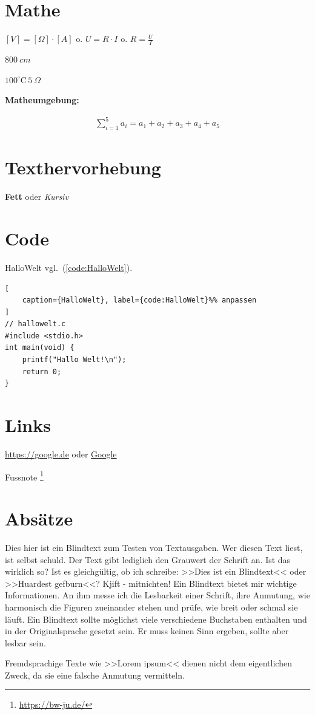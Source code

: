 \section{Mathe}\label{mathe}

$[ V ] = [ \Omega ] \cdot [ A ]$ o. $U = R \cdot I$ o.
$R = \frac{U}{I}$

$800~cm$

$100^\circ\text{C} \, 5~\Omega$

\textbf{Matheumgebung:}

\begin{align*}
    \sum_{i=1}^5 a_i = a_1 + a_2 + a_3 + a_4 + a_5
\end{align*}

\section{Texthervorhebung}\label{texthervorhebung}

\textbf{Fett} oder \emph{Kursiv}

\section{Code}\label{code}

HalloWelt vgl.~(\autoref{code:HalloWelt}).

\lstset{language=C}%
\begin{lstlisting}[
	caption={HalloWelt}, label={code:HalloWelt}%% anpassen
]
// hallowelt.c
#include <stdio.h>
int main(void) {
    printf("Hallo Welt!\n");
    return 0;
}
\end{lstlisting}

\section{Links}\label{links}

\url{https://google.de} oder \href{https://google.de}{Google}

Fussnote \footnote{\url{https://bw-ju.de/}}

\section{Absätze}\label{absaetze}

Dies hier ist ein Blindtext zum Testen von Textausgaben. Wer diesen Text
liest, ist selbst schuld. Der Text gibt lediglich den Grauwert der
Schrift an. Ist das wirklich so? Ist es gleichgültig, ob ich schreibe:
>>Dies ist ein Blindtext<< oder >>Huardest gefburn<<? Kjift -
mitnichten! Ein Blindtext bietet mir wichtige Informationen. An ihm
messe ich die Lesbarkeit einer Schrift, ihre Anmutung, wie harmonisch
die Figuren zueinander stehen und prüfe, wie breit oder schmal sie
läuft. Ein Blindtext sollte möglichst viele verschiedene Buchstaben
enthalten und in der Originalsprache gesetzt sein. Er muss keinen Sinn
ergeben, sollte aber lesbar sein.

Fremdsprachige Texte wie >>Lorem ipsum<< dienen nicht dem eigentlichen
Zweck, da sie eine falsche Anmutung vermitteln.
